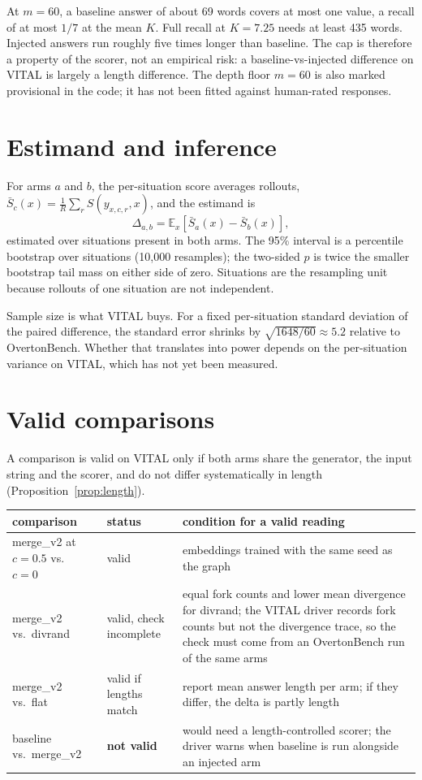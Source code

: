 \documentclass[11pt]{article}
\theoremstyle{definition}
\newcommand{\E}{\mathbb{E}}
\newcommand{\1}{\mathbf{1}}
\begin{document}
\noindent
At $m = 60$, a baseline answer of about 69 words covers at most one value, a
recall of at most $1/7$ at the mean $K$. Full recall at $K = 7.25$ needs at
least 435 words. Injected answers run roughly five times longer than baseline.
The cap is therefore a property of the scorer, not an empirical risk: a
baseline-vs-injected difference on VITAL is largely a length difference.
The depth floor $m = 60$ is also marked provisional in the code; it has not been
fitted against human-rated responses.

\section{Estimand and inference}

For arms $a$ and $b$, the per-situation score averages rollouts,
$\bar S_c(x) = \frac{1}{R}\sum_r S(y_{x,c,r}, x)$, and the estimand is
\[
  \Delta_{a,b} = \E_x\!\left[\bar S_a(x) - \bar S_b(x)\right],
\]
estimated over situations present in both arms. The 95\% interval is a percentile
bootstrap over situations (10{,}000 resamples); the two-sided $p$ is twice the
smaller bootstrap tail mass on either side of zero. Situations are the resampling
unit because rollouts of one situation are not independent.

Sample size is what VITAL buys. For a fixed per-situation standard deviation of
the paired difference, the standard error shrinks by $\sqrt{1648/60} \approx 5.2$
relative to OvertonBench. Whether that translates into power depends on the
per-situation variance on VITAL, which has not yet been measured.

\section{Valid comparisons}\label{sec:valid}

A comparison is valid on VITAL only if both arms share the generator, the input
string and the scorer, and do not differ systematically in length
(Proposition~\ref{prop:length}).

\begin{table}[h]
\centering
\small
\begin{tabular}{@{}p{3.9cm}p{2.3cm}p{8.6cm}@{}}
\toprule
comparison & status & condition for a valid reading \\
\midrule
merge\_v2 at $c{=}0.5$ vs.\ $c{=}0$ & valid & embeddings trained with the same seed as the graph \\
merge\_v2 vs.\ divrand & valid, check incomplete & equal fork counts and lower mean divergence for divrand; the VITAL driver records fork counts but not the divergence trace, so the check must come from an OvertonBench run of the same arms \\
merge\_v2 vs.\ flat & valid if lengths match & report mean answer length per arm; if they differ, the delta is partly length \\
baseline vs.\ merge\_v2 & \textbf{not valid} & would need a length-controlled scorer; the driver warns when baseline is run alongside an injected arm \\
\bottomrule
\end{tabular}
\end{table}
\end{document}
